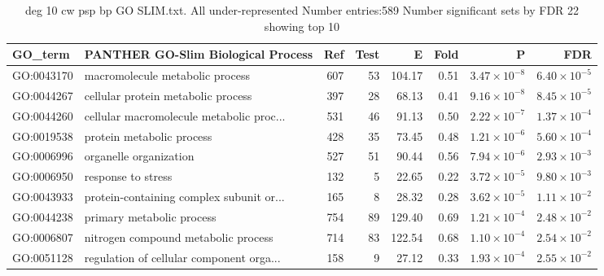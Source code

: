  \begin{table}[ht]
\centering
\begin{tabular}{llrrrrrr}
  \hline
GO\_term & PANTHER GO-Slim Biological Process & Ref & Test & E & Fold & P & FDR \\ 
  \hline
GO:0043170 & macromolecule metabolic process  & 607 & 53 & 104.17 & 0.51 & $3.47 \times 10^{-8}$ & $6.40 \times 10^{-5}$ \\ 
  GO:0044267 & cellular protein metabolic process  & 397 & 28 & 68.13 & 0.41 & $9.16 \times 10^{-8}$ & $8.45 \times 10^{-5}$ \\ 
  GO:0044260 & cellular macromolecule metabolic proc... & 531 & 46 & 91.13 & 0.50 & $2.22 \times 10^{-7}$ & $1.37 \times 10^{-4}$ \\ 
  GO:0019538 & protein metabolic process  & 428 & 35 & 73.45 & 0.48 & $1.21 \times 10^{-6}$ & $5.60 \times 10^{-4}$ \\ 
  GO:0006996 & organelle organization  & 527 & 51 & 90.44 & 0.56 & $7.94 \times 10^{-6}$ & $2.93 \times 10^{-3}$ \\ 
  GO:0006950 & response to stress  & 132 & 5 & 22.65 & 0.22 & $3.72 \times 10^{-5}$ & $9.80 \times 10^{-3}$ \\ 
  GO:0043933 & protein-containing complex subunit or... & 165 & 8 & 28.32 & 0.28 & $3.62 \times 10^{-5}$ & $1.11 \times 10^{-2}$ \\ 
  GO:0044238 & primary metabolic process  & 754 & 89 & 129.40 & 0.69 & $1.21 \times 10^{-4}$ & $2.48 \times 10^{-2}$ \\ 
  GO:0006807 & nitrogen compound metabolic process  & 714 & 83 & 122.54 & 0.68 & $1.10 \times 10^{-4}$ & $2.54 \times 10^{-2}$ \\ 
  GO:0051128 & regulation of cellular component orga... & 158 & 9 & 27.12 & 0.33 & $1.93 \times 10^{-4}$ & $2.55 \times 10^{-2}$ \\ 
  \hline
\end{tabular}
\caption{deg 10 cw psp bp GO SLIM.txt. All under-represented Number entries:589 Number significant sets by FDR 22 showing top 10} 
\label{tab:deg 10 cw psp bp GO SLIM.txt Number entries:589 All under-represented Number significant sets by FDR 22 showing top 10}
\end{table}

